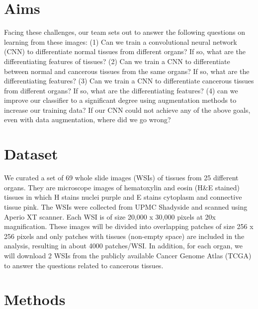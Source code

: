 \documentclass[10pt,twocolumn,letterpaper]{article}
\begin{document}
\section{Aims}
\label{sec:Aims}

Facing these challenges, our team sets out to answer the following questions
on learning from these images: (1) Can we train a convolutional neural network
(CNN) to differentiate normal tissues from different organs? If so, what are
the differentiating features of tissues? (2) Can we train a CNN to
differentiate between normal and cancerous tissues from the same organs?
If so, what are the differentiating features? (3) Can we train a CNN to
differentiate cancerous tissues from different organs? If so, what are the
differentiating features? (4) can we improve our classifier to a significant
degree using augmentation methods to increase our training data? If our CNN
could not achieve any of the above goals, even with data augmentation, where
did we go wrong?

\section{Dataset}
\label{sec:Dataset}

We curated a set of 69 whole slide images (WSIs) of tissues from 25 different
organs. They are microscope images of hematoxylin and eosin (H\&E stained)
tissues in which H stains nuclei purple and E stains cytoplasm and connective
tissue pink. The WSIs were collected from UPMC Shadyside and scanned using
Aperio XT scanner. Each WSI is of size 20,000 x 30,000 pixels at 20x
magnification. These images will be divided into overlapping patches of size
256 x 256 pixels and only patches with tissues (non-empty space) are included
in the analysis, resulting in about 4000 patches/WSI. In addition, for each
organ, we will download 2 WSIs from the publicly available Cancer Genome Atlas
(TCGA) to answer the questions related to cancerous tissues.

\section{Methods}
\label{sec:Methods}
\end{document}
